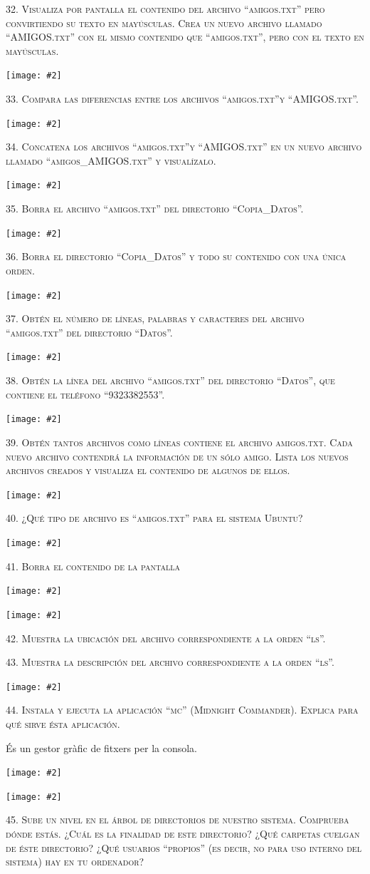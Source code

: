 \documentclass[a4paper,12pt]{article}
\newcommand{\mygraphic}[2][height=0.45\textheight]{\begin{center}
		\centering\texttt{[image: \#2]}\par
\end{center}}
\begin{document}
\newpage
\textsc{32. Visualiza por pantalla el contenido del archivo “amigos.txt” pero convirtiendo su texto en mayúsculas. Crea un nuevo archivo llamado “AMIGOS.txt” con el mismo contenido que “amigos.txt”, pero con el texto en mayúsculas.}
\mygraphic{imatges/32.png}

\newpage
\textsc{33. Compara las diferencias entre los archivos “amigos.txt”y “AMIGOS.txt”.}
\mygraphic{imatges/33.png}

\newpage
\textsc{34. Concatena los archivos “amigos.txt”y “AMIGOS.txt” en un nuevo archivo llamado “amigos\_AMIGOS.txt” y visualízalo.}
\mygraphic{imatges/34.png}

\newpage
\textsc{35. Borra el archivo “amigos.txt” del directorio “Copia\_Datos”.}
\mygraphic{imatges/35.png}

\newpage
\textsc{36. Borra el directorio “Copia\_Datos” y todo su contenido con una única orden.}
\mygraphic{imatges/36.png}

\newpage
\textsc{37. Obtén el número de líneas, palabras y caracteres del archivo “amigos.txt” del directorio “Datos”.}
\mygraphic{imatges/37.png}

\newpage
\textsc{38. Obtén la línea del archivo “amigos.txt” del directorio “Datos”, que contiene el teléfono “9323382553”.}
\mygraphic{imatges/38.png}

\newpage
\textsc{39. Obtén tantos archivos como líneas contiene el archivo amigos.txt. Cada nuevo archivo contendrá la información de un sólo amigo. Lista los nuevos archivos creados y visualiza el contenido de algunos de ellos.}
\mygraphic{imatges/39.png}

\newpage
\textsc{40. ¿Qué tipo de archivo es “amigos.txt” para el sistema Ubuntu?}
\mygraphic{imatges/40.png}

\newpage
\textsc{41. Borra el contenido de la pantalla}
\mygraphic{imatges/41a.png}
\mygraphic{imatges/41b.png}

\newpage
\textsc{42. Muestra la ubicación del archivo correspondiente a la orden “ls”.}

\textsc{43. Muestra la descripción del archivo correspondiente a la orden “ls”.}
\mygraphic{imatges/42-43.png}

\newpage
\textsc{44. Instala y ejecuta la aplicación “mc” (Midnight Commander). Explica para qué sirve ésta aplicación.}

És un gestor gràfic de fitxers per la consola.
\mygraphic{imatges/44a.png}
\mygraphic{imatges/44b.png}

\newpage
\textsc{45. Sube un nivel en el árbol de directorios de nuestro sistema. Comprueba dónde estás. ¿Cuál es la finalidad de este directorio? ¿Qué carpetas cuelgan de éste directorio? ¿Qué usuarios “propios” (es decir, no para uso interno del sistema) hay en tu ordenador?}
\end{document}
